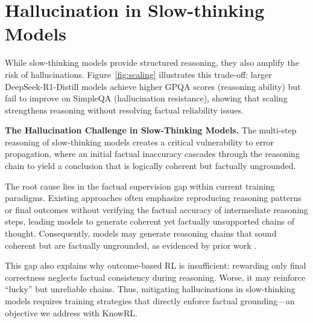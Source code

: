 



\section{Hallucination in Slow-thinking Models}



While slow-thinking models provide structured reasoning, they also amplify the risk of hallucinations. 
Figure~\ref{fig:scaling} illustrates this trade-off: larger DeepSeek-R1-Distill models achieve higher GPQA scores (reasoning ability) but fail to improve on SimpleQA (hallucination resistance), showing that scaling strengthens reasoning without resolving factual reliability issues.

\begin{definitionbox}
\textbf{The Hallucination Challenge in Slow-Thinking Models.} The multi-step reasoning of slow-thinking models creates a critical vulnerability to error propagation, where an initial factual inaccuracy cascades through the reasoning chain to yield a conclusion that is logically coherent but factually ungrounded.
\end{definitionbox}

The root cause lies in the factual supervision gap within current training paradigms. Existing approaches often emphasize reproducing reasoning patterns or final outcomes without verifying the factual accuracy of intermediate reasoning steps, leading models to generate coherent yet factually unsupported chains of thought.
Consequently, models may generate reasoning chains that sound coherent but are factually ungrounded, as evidenced by prior work \citep{heyman2025reasoning,patel2024multi,arcuschin2025chain}. 

This gap also explains why outcome-based RL is insufficient: rewarding only final correctness neglects factual consistency during reasoning. 
Worse, it may reinforce “lucky” but unreliable chains. 
Thus, mitigating hallucinations in slow-thinking models requires training strategies that directly enforce factual grounding—an objective we address with KnowRL.

